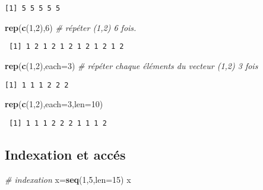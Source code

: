 \documentclass[
]{article}
\newenvironment{Shaded}{\begin{snugshade}}{\end{snugshade}}
\newcommand{\CommentTok}[1]{\textcolor[rgb]{0.56,0.35,0.01}{\textit{#1}}}
\newcommand{\DataTypeTok}[1]{\textcolor[rgb]{0.13,0.29,0.53}{#1}}
\newcommand{\DecValTok}[1]{\textcolor[rgb]{0.00,0.00,0.81}{#1}}
\newcommand{\KeywordTok}[1]{\textcolor[rgb]{0.13,0.29,0.53}{\textbf{#1}}}
\newcommand{\NormalTok}[1]{#1}
\begin{document}
\begin{verbatim}
[1] 5 5 5 5 5
\end{verbatim}

\begin{Shaded}
\begin{Highlighting}[]
\KeywordTok{rep}\NormalTok{(}\KeywordTok{c}\NormalTok{(}\DecValTok{1}\NormalTok{,}\DecValTok{2}\NormalTok{),}\DecValTok{6}\NormalTok{) }\CommentTok{# répéter (1,2) 6 fois.}
\end{Highlighting}
\end{Shaded}

\begin{verbatim}
 [1] 1 2 1 2 1 2 1 2 1 2 1 2
\end{verbatim}

\begin{Shaded}
\begin{Highlighting}[]
\KeywordTok{rep}\NormalTok{(}\KeywordTok{c}\NormalTok{(}\DecValTok{1}\NormalTok{,}\DecValTok{2}\NormalTok{),}\DataTypeTok{each=}\DecValTok{3}\NormalTok{) }\CommentTok{# répéter chaque éléments du vecteur (1,2) 3 fois}
\end{Highlighting}
\end{Shaded}

\begin{verbatim}
[1] 1 1 1 2 2 2
\end{verbatim}

\begin{Shaded}
\begin{Highlighting}[]
\KeywordTok{rep}\NormalTok{(}\KeywordTok{c}\NormalTok{(}\DecValTok{1}\NormalTok{,}\DecValTok{2}\NormalTok{),}\DataTypeTok{each=}\DecValTok{3}\NormalTok{,}\DataTypeTok{len=}\DecValTok{10}\NormalTok{)}
\end{Highlighting}
\end{Shaded}

\begin{verbatim}
 [1] 1 1 1 2 2 2 1 1 1 2
\end{verbatim}

\hypertarget{indexation-et-accuxe9s}{%
\subsection{Indexation et accés}\label{indexation-et-accuxe9s}}

\begin{Shaded}
\begin{Highlighting}[]
\CommentTok{# indexation}
\NormalTok{x=}\KeywordTok{seq}\NormalTok{(}\DecValTok{1}\NormalTok{,}\DecValTok{5}\NormalTok{,}\DataTypeTok{len=}\DecValTok{15}\NormalTok{)}
\NormalTok{x}
\end{Highlighting}
\end{Shaded}
\end{document}
